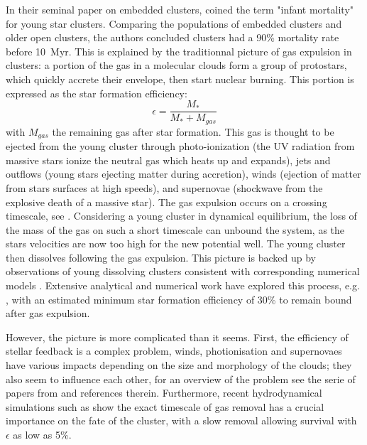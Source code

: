 In their seminal paper on embedded clusters, \cite{Lada2003} coined the term "infant mortality" for young star clusters. Comparing the populations of embedded clusters and older open clusters, the authors concluded clusters had a 90\% mortality rate before 10~Myr. This is explained by the traditionnal picture of gas expulsion in clusters: a portion of the gas in a molecular clouds form a group of protostars, which quickly accrete their envelope, then start nuclear burning. This portion is expressed as the star formation efficiency:
\begin{equation}
\epsilon = \frac{M_*}{M_* + M_{gas}}
\end{equation} 
with $M_{gas}$ the remaining gas after star formation. This gas is thought to be ejected from the young cluster through photo-ionization (the UV radiation from massive stars ionize the neutral gas which heats up and expands), jets and outflows (young stars ejecting matter during accretion), winds (ejection of matter from stars surfaces at high speeds), and supernovae (shockwave from the explosive death of a massive star). The gas expulsion occurs on a crossing timescale, see \cite{Krause2016}. Considering a young cluster in dynamical equilibrium, the loss of the mass of the gas on such a short timescale can unbound the system, as the stars velocities are now too high for the new potential well. The young cluster then dissolves following the gas expulsion.
This picture is backed up by observations of young dissolving clusters \citep{Bastian2006} consistent with corresponding numerical models \citep{Goodwin2006}. Extensive analytical and numerical work have explored this process, e.g. \cite{Tutukov1978,Hills1980,Lada1984,Adams2000,Boily2003a,Boily2003b}, with an estimated minimum star formation efficiency of 30\% to remain bound after gas expulsion.

However, the picture is more complicated than it seems. First, the efficiency of stellar feedback is a complex problem, winds, photionisation and supernovaes have various impacts depending on the size and morphology of the clouds; they also seem to influence each other, for an overview of the problem see the serie of papers from \cite{Dale2011,Dale2013} and references therein. Furthermore, recent hydrodynamical simulations such as \cite{Pelupessy2012} show the exact timescale of gas removal has a crucial importance on the fate of the cluster, with a slow removal allowing survival with $\epsilon$ as low as 5\%.




